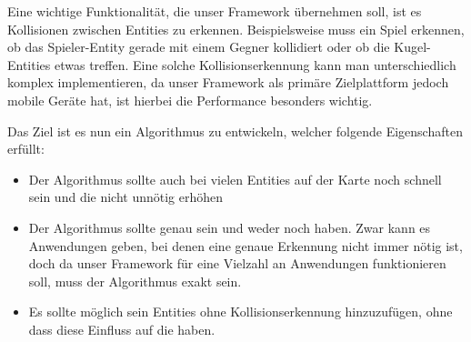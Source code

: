 








Eine wichtige Funktionalität, die unser Framework übernehmen soll, ist es Kollisionen zwischen Entities zu erkennen. Beispielsweise muss ein Spiel erkennen, ob das Spieler-Entity gerade mit einem Gegner kollidiert oder ob die Kugel-Entities etwas treffen. Eine solche Kollisionserkennung kann man unterschiedlich komplex implementieren, da unser Framework als primäre Zielplattform jedoch mobile Geräte hat, ist hierbei die Performance besonders wichtig.

Das Ziel ist es nun ein Algorithmus zu entwickeln, welcher folgende Eigenschaften erfüllt:\cite[S 73]{KRAY}

\begin{itemize}
\item Der Algorithmus sollte auch bei vielen Entities auf der Karte noch schnell sein und die  nicht unnötig erhöhen \cite[S 14f]{KRAY}
\item Der Algorithmus sollte genau sein und weder  noch  haben. Zwar kann es Anwendungen geben, bei denen eine genaue Erkennung nicht immer nötig ist, doch da unser Framework für eine Vielzahl an Anwendungen funktionieren soll, muss der Algorithmus exakt sein.
\item Es sollte möglich sein Entities ohne Kollisionserkennung hinzuzufügen, ohne dass diese Einfluss auf die  haben.
\end{itemize}

